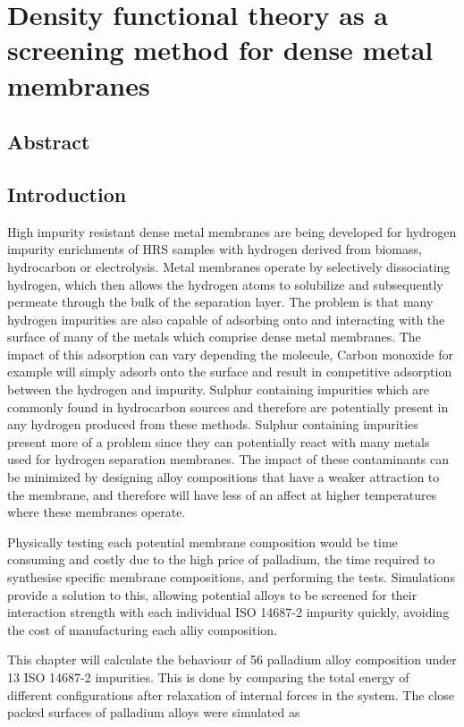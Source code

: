 \chapter{Density functional theory as a screening method for dense metal membranes}

\section{Abstract}

\section{Introduction}
High impurity resistant dense metal membranes are being developed for hydrogen impurity enrichments of HRS samples with hydrogen derived from biomass, hydrocarbon or electrolysis. Metal membranes operate by selectively dissociating hydrogen, which then allows the hydrogen atoms to solubilize and subsequently permeate through the bulk of the separation layer. The problem is that many hydrogen impurities are also capable of adsorbing onto and interacting with the surface of many of the metals which comprise dense metal membranes. The impact of this adsorption can vary depending the molecule, Carbon monoxide for example will simply adsorb onto the surface and result in competitive adsorption between the hydrogen and impurity. Sulphur containing impurities which are commonly found in hydrocarbon sources and therefore are potentially present in any hydrogen produced from these methods. Sulphur containing impurities present more of a problem since they can potentially react with many metals used for hydrogen separation membranes. The impact of these contaminants can be minimized by designing alloy compositions that have a weaker attraction to the membrane, and therefore will have less of an affect at higher temperatures where these membranes operate.

Physically testing each potential membrane composition would be time consuming and costly due to the high price of palladium, the time required to synthesise specific membrane compositions, and performing the tests. Simulations provide a solution to this, allowing potential alloys to be screened for their interaction strength with each individual ISO 14687-2 impurity quickly, avoiding the cost of manufacturing each alliy composition. 

This chapter will calculate the behaviour of 56 palladium alloy composition under 13 ISO 14687-2 impurities. This is done by comparing the total energy of different configurations after relaxation of internal forces in the system. The close packed surfaces of palladium alloys were simulated as 

